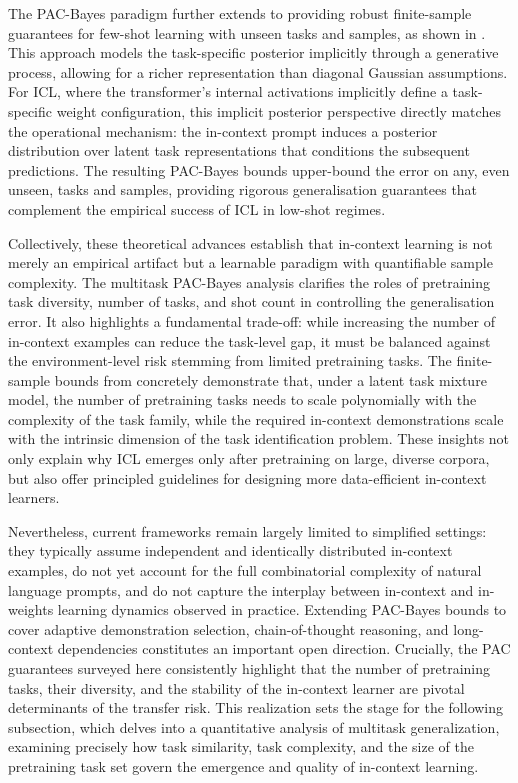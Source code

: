 \documentclass[11pt]{article}
\begin{document}
The PAC-Bayes paradigm further extends to providing robust finite-sample guarantees for few-shot learning with unseen tasks and samples, as shown in \cite{ref25}. This approach models the task-specific posterior implicitly through a generative process, allowing for a richer representation than diagonal Gaussian assumptions. For ICL, where the transformer's internal activations implicitly define a task-specific weight configuration, this implicit posterior perspective directly matches the operational mechanism: the in-context prompt induces a posterior distribution over latent task representations that conditions the subsequent predictions. The resulting PAC-Bayes bounds upper-bound the error on any, even unseen, tasks and samples, providing rigorous generalisation guarantees that complement the empirical success of ICL in low-shot regimes.

Collectively, these theoretical advances establish that in-context learning is not merely an empirical artifact but a learnable paradigm with quantifiable sample complexity. The multitask PAC-Bayes analysis clarifies the roles of pretraining task diversity, number of tasks, and shot count in controlling the generalisation error. It also highlights a fundamental trade-off: while increasing the number of in-context examples can reduce the task-level gap, it must be balanced against the environment-level risk stemming from limited pretraining tasks. The finite-sample bounds from \cite{ref21} concretely demonstrate that, under a latent task mixture model, the number of pretraining tasks needs to scale polynomially with the complexity of the task family, while the required in-context demonstrations scale with the intrinsic dimension of the task identification problem. These insights not only explain why ICL emerges only after pretraining on large, diverse corpora, but also offer principled guidelines for designing more data-efficient in-context learners.

Nevertheless, current frameworks remain largely limited to simplified settings: they typically assume independent and identically distributed in-context examples, do not yet account for the full combinatorial complexity of natural language prompts, and do not capture the interplay between in-context and in-weights learning dynamics observed in practice. Extending PAC-Bayes bounds to cover adaptive demonstration selection, chain-of-thought reasoning, and long-context dependencies constitutes an important open direction. Crucially, the PAC guarantees surveyed here consistently highlight that the number of pretraining tasks, their diversity, and the stability of the in-context learner are pivotal determinants of the transfer risk. This realization sets the stage for the following subsection, which delves into a quantitative analysis of multitask generalization, examining precisely how task similarity, task complexity, and the size of the pretraining task set govern the emergence and quality of in-context learning.
\end{document}
